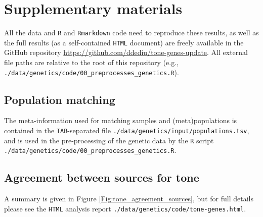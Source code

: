 \documentclass[twoside,onecolumn]{article}
\begin{document}

\onecolumn
\section{Supplementary materials}

All the data and \texttt{R} and \texttt{Rmarkdown} code need to reproduce these results, as well as the full results (as a self-contained \texttt{HTML} document) are freely available in the GitHub repository \url{https://github.com/ddediu/tone-genes-update}.
All external file paths are relative to the root of this repository (e.g., \verb|./data/genetics/code/00_preprocesses_genetics.R|).


\subsection{Population matching} \label{SM:pop_match}

The meta-information used for matching samples and (meta)populations is contained in the \texttt{TAB}-separated file \verb|./data/genetics/input/populations.tsv|, and is used in the pre-processing of the genetic data by the \texttt{R} script \verb|./data/genetics/code/00_preprocesses_genetics.R|.


\subsection{Agreement between sources for tone} \label{SM:tone_agreeemnt_sources}

A summary is given in Figure \ref{Fig:tone_agreement_sources}, but for full details please see the \texttt{HTML} analysis report \verb|./data/genetics/code/tone-genes.html|.
\end{document}
